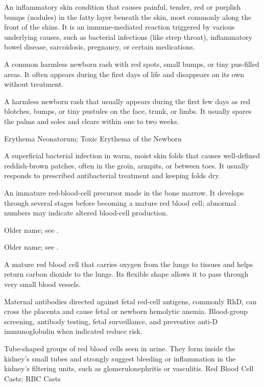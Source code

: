  An inflammatory skin condition that causes painful, tender, red or purplish bumps (nodules) in the fatty layer beneath the skin, most commonly along the front of the shins. It is an immune-mediated reaction triggered by various underlying causes, such as bacterial infections (like strep throat), inflammatory bowel disease, sarcoidosis, pregnancy, or certain medications.

 A common harmless newborn rash with red spots, small bumps, or tiny pus-filled areas. It often appears during the first days of life and disappears on its own without treatment.

 A harmless newborn rash that usually appears during the first few days as red blotches, bumps, or tiny pustules on the face, trunk, or limbs. It usually spares the palms and soles and clears within one to two weeks.

\synonyms
Erythema Neonatorum; Toxic Erythema of the Newborn

 A superficial bacterial infection in warm, moist skin folds that causes well-defined reddish-brown patches, often in the groin, armpits, or between toes. It usually responds to prescribed antibacterial treatment and keeping folds dry.

 An immature red-blood-cell precursor made in the bone marrow. It develops through several stages before becoming a mature red blood cell; abnormal numbers may indicate altered blood-cell production.

 Older name; see .

 Older name; see .

 A mature red blood cell that carries oxygen from the lungs to tissues and helps return carbon dioxide to the lungs. Its flexible shape allows it to pass through very small blood vessels.

 Maternal antibodies directed against fetal red-cell antigens, commonly RhD, can cross the placenta and cause fetal or newborn hemolytic anemia. Blood-group screening, antibody testing, fetal surveillance, and preventive anti-D immunoglobulin when indicated reduce risk.

 Tube-shaped groups of red blood cells seen in urine. They form inside the kidney's small tubes and strongly suggest bleeding or inflammation in the kidney's filtering units, such as glomerulonephritis or vasculitis.
\synonyms
Red Blood Cell Casts; RBC Casts

